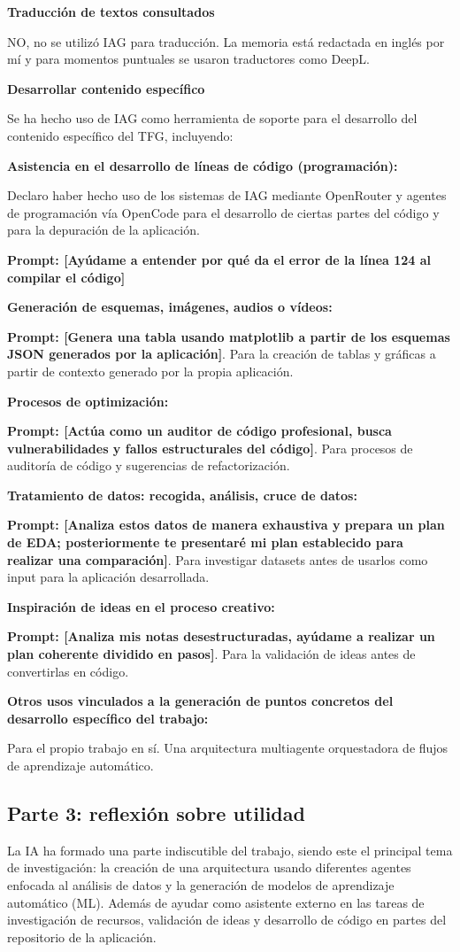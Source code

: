 \textbf{Traducción de textos consultados}

NO, no se utilizó IAG para traducción. La memoria está redactada en inglés por mí y para momentos puntuales se usaron traductores como DeepL.

\textbf{Desarrollar contenido específico}

Se ha hecho uso de IAG como herramienta de soporte para el desarrollo del contenido específico del TFG, incluyendo:

\textbf{Asistencia en el desarrollo de líneas de código (programación):}

Declaro haber hecho uso de los sistemas de IAG mediante OpenRouter y agentes de programación vía OpenCode para el desarrollo de ciertas partes del código y para la depuración de la aplicación.

\textbf{Prompt: [Ayúdame a entender por qué da el error de la línea 124 al compilar el código]}

\textbf{Generación de esquemas, imágenes, audios o vídeos:}

\textbf{Prompt: [Genera una tabla usando matplotlib a partir de los esquemas JSON generados por la aplicación]}. Para la creación de tablas y gráficas a partir de contexto generado por la propia aplicación.

\textbf{Procesos de optimización:}

\textbf{Prompt: [Actúa como un auditor de código profesional, busca vulnerabilidades y fallos estructurales del código]}. Para procesos de auditoría de código y sugerencias de refactorización.

\textbf{Tratamiento de datos: recogida, análisis, cruce de datos:}

\textbf{Prompt: [Analiza estos datos de manera exhaustiva y prepara un plan de EDA; posteriormente te presentaré mi plan establecido para realizar una comparación]}. Para investigar datasets antes de usarlos como input para la aplicación desarrollada.

\textbf{Inspiración de ideas en el proceso creativo:}

\textbf{Prompt: [Analiza mis notas desestructuradas, ayúdame a realizar un plan coherente dividido en pasos]}. Para la validación de ideas antes de convertirlas en código.

\textbf{Otros usos vinculados a la generación de puntos concretos del desarrollo específico del trabajo:}

Para el propio trabajo en sí. Una arquitectura multiagente orquestadora de flujos de aprendizaje automático.

\subsection*{Parte 3: reflexión sobre utilidad}

La IA ha formado una parte indiscutible del trabajo, siendo este el principal tema de investigación: la creación de una arquitectura usando diferentes agentes enfocada al análisis de datos y la generación de modelos de aprendizaje automático (ML). Además de ayudar como asistente externo en las tareas de investigación de recursos, validación de ideas y desarrollo de código en partes del repositorio de la aplicación.
